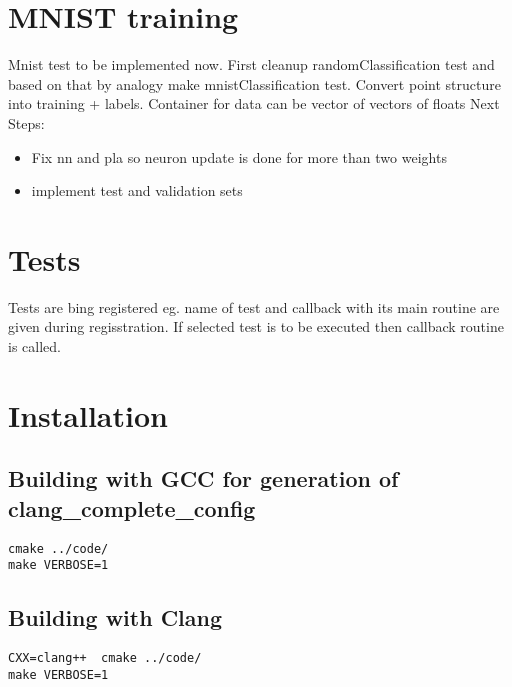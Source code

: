 \documentclass[a4paper,10pt]{article}
\begin{document}
\section{MNIST training}
Mnist test to be implemented now. First cleanup randomClassification test and based on that by analogy make mnistClassification test.
Convert point structure into training + labels. Container for data can be vector of vectors of floats
Next Steps:
\begin{itemize}
\item Fix nn and pla so neuron update is done for more than two weights
\item implement test and validation sets
\end{itemize}



\section{Tests}
Tests are bing registered eg. name of test and callback with its main routine are given during regisstration. 
If selected test is to be executed then callback routine is called.

\section{Installation}
\subsection{Building with GCC for generation of clang\_complete\_config}
\begin{verbatim}
cmake ../code/
make VERBOSE=1
\end{verbatim}
\subsection{Building with Clang}
\begin{verbatim}
CXX=clang++  cmake ../code/
make VERBOSE=1
\end{verbatim}
\end{document}
